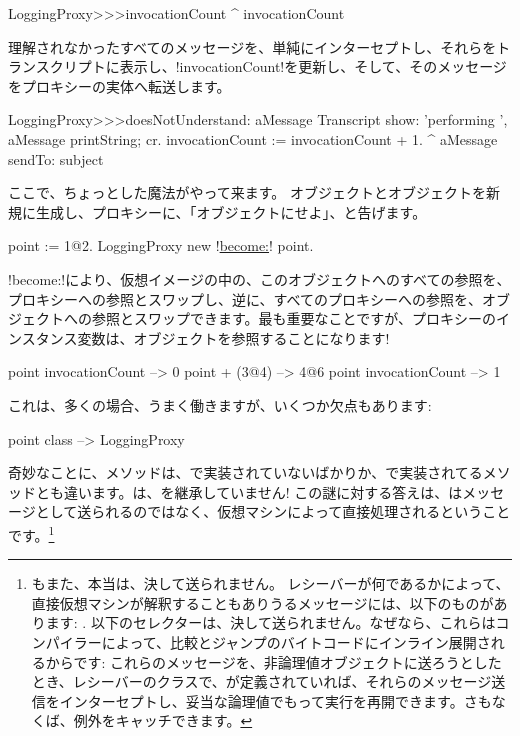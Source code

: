 \documentclass[a4paper,10pt,twoside]{book}
\begin{document}
\begin{code}{}
LoggingProxy>>>invocationCount
	^ invocationCount
\end{code}

理解されなかったすべてのメッセージを、単純にインターセプトし、それらをトランスクリプトに表示し、\ct!invocationCount!を更新し、そして、そのメッセージをプロキシーの実体へ転送します。
\begin{code}{}
LoggingProxy>>>doesNotUnderstand: aMessage 
	Transcript show: 'performing ', aMessage printString; cr.
	invocationCount := invocationCount + 1.
	^ aMessage sendTo: subject
\end{code}

ここで、ちょっとした魔法がやって来ます。
オブジェクトとオブジェクトを新規に生成し、プロキシーに、「オブジェクトにせよ」、と告げます。
\begin{code}{}
point := 1@2.
LoggingProxy new !\underline{become:}! point.
\end{code}

\ct!become:!により、仮想イメージの中の、このオブジェクトへのすべての参照を、プロキシーへの参照とスワップし、逆に、すべてのプロキシーへの参照を、オブジェクトへの参照とスワップできます。最も重要なことですが、プロキシーのインスタンス変数は、オブジェクトを参照することになります!

\begin{code}{}
point invocationCount --> 0
point + (3@4)             --> 4@6
point invocationCount --> 1
\end{code}

これは、多くの場合、うまく働きますが、いくつか欠点もあります:
\begin{code}{}
point class --> LoggingProxy
\end{code}
奇妙なことに、メソッドは、で実装されていないばかりか、で実装されてるメソッドとも違います。は、を継承していません!
この謎に対する答えは、はメッセージとして送られるのではなく、仮想マシンによって直接処理されるということです。\footnote{もまた、本当は、決して送られません。
レシーバーが何であるかによって、直接仮想マシンが解釈することもありうるメッセージには、以下のものがあります:
\ct{+- < > <= >= = ~= * / \ ==}
.
以下のセレクターは、決して送られません。なぜなら、これらはコンパイラーによって、比較とジャンプのバイトコードにインライン展開されるからです:
これらのメッセージを、非論理値オブジェクトに送ろうとしたとき、レシーバーのクラスで、が定義されていれば、それらのメッセージ送信をインターセプトし、妥当な論理値でもって実行を再開できます。さもなくば、例外をキャッチできます。
}%
\end{document}
